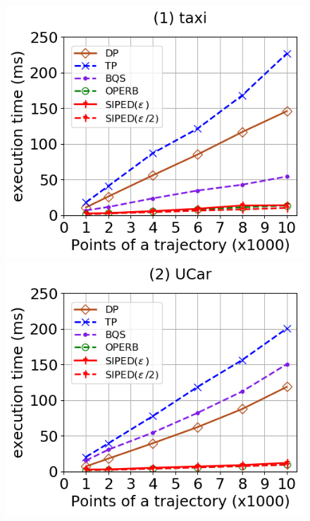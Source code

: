 \begin{figure}[tb!]
	\centering
	\includegraphics[scale=0.315]{Figures/Exp-PED-time-size-taxi.png}\hspace{1ex}
	\includegraphics[scale=0.315]{Figures/Exp-PED-time-size-service.png}	\hspace{1ex}

\end{figure}
